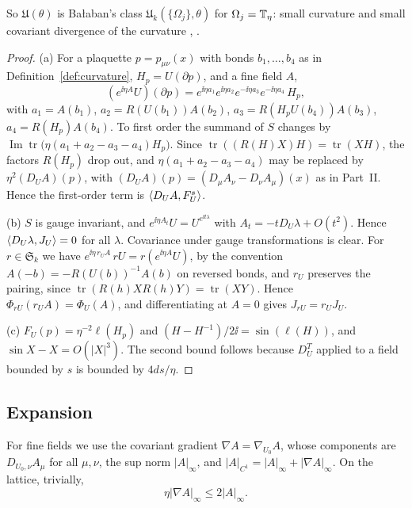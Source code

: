 So $\mathfrak U(\theta)$ is Ba\l aban's class $\mathfrak U_k(\{\Omega_j\},\theta)$ for $\Omega_j=\mathbb T_\eta$: small curvature and small covariant divergence of the curvature \cite[(1.7)--(1.9)]{BalReg}, \cite[(2)]{BalVar}.

\begin{proof}
(a) For a plaquette $p=p_{\mu\nu}(x)$ with bonds $b_1,\dots,b_4$ as in Definition~\ref{def:curvature}, $H_p=U(\partial p)$, and a fine field $A$,
\begin{equation}\label{eq:plaquette-product}
(e^{\ii\eta A}U)(\partial p)=e^{\ii\eta a_1}e^{\ii\eta a_2}e^{-\ii\eta a_3}e^{-\ii\eta a_4}\,H_p,
\end{equation}
with $a_1=A(b_1)$, $a_2=R(U(b_1))A(b_2)$, $a_3=R(H_pU(b_4))A(b_3)$, $a_4=R(H_p)A(b_4)$. To first order the summand of $S$ changes by $\operatorname{Im}\operatorname{tr}\big(\eta(a_1+a_2-a_3-a_4)H_p\big)$. Since $\operatorname{tr}((R(H)X)H)=\operatorname{tr}(XH)$, the factors $R(H_p)$ drop out, and $\eta(a_1+a_2-a_3-a_4)$ may be replaced by $\eta^2(D_UA)(p)$, with $(D_UA)(p)=(D_\mu A_\nu-D_\nu A_\mu)(x)$ as in Part~II. Hence the first-order term is $\langle D_UA,F^s_U\rangle$.

(b) $S$ is gauge invariant, and $e^{\ii\eta A_t}U=U^{e^{\ii t\lambda}}$ with $A_t=-tD_U\lambda+O(t^2)$. Hence $\langle D_U\lambda,J_U\rangle=0$ for all $\lambda$. Covariance under gauge transformations is clear. For $r\in\mathfrak S_k$ we have $e^{\ii\eta\,r_UA}\,rU=r(e^{\ii\eta A}U)$, by the convention $A(-b)=-R(U(b))^{-1}A(b)$ on reversed bonds, and $r_U$ preserves the pairing, since $\operatorname{tr}(R(h)XR(h)Y)=\operatorname{tr}(XY)$. Hence $\Phi_{rU}(r_UA)=\Phi_U(A)$, and differentiating at $A=0$ gives $J_{rU}=r_UJ_U$.

(c) $F_U(p)=\eta^{-2}\ell(H_p)$ and $(H-H^{-1})/2\ii=\sin(\ell(H))$, and $\sin X-X=O(|X|^3)$. The second bound follows because $D^T_U$ applied to a field bounded by $s$ is bounded by $4ds/\eta$.
\end{proof}

\subsection{Expansion}\label{ss:23.2}

For fine fields we use the covariant gradient $\nabla A=\nabla_{U_0}A$, whose components are $D_{U_0,\nu}A_\mu$ for all $\mu,\nu$, the sup norm $|A|_\infty$, and $|A|_{C^1}=|A|_\infty+|\nabla A|_\infty$. On the lattice, trivially,
\begin{equation}\label{eq:lattice-trick}
\eta|\nabla A|_\infty\le2|A|_\infty .
\end{equation}

